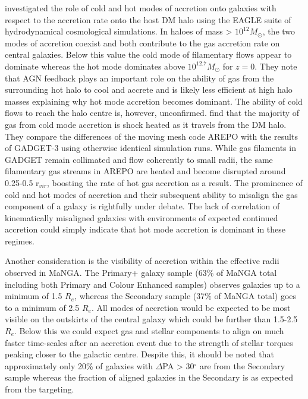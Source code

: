 \citet{correa2018} investigated the role of cold and hot modes of accretion onto galaxies with respect to the accretion rate onto the host DM halo using the EAGLE suite of hydrodynamical cosmological simulations. In haloes of mass > $10^{12}M_{\odot}$, the two modes of accretion coexist and both contribute to the gas accretion rate on central galaxies. Below this value the cold mode of filamentary flows appear to dominate whereas the hot mode dominates above $10^{12.7}M_{\odot}$ for $z = 0$.  They note that AGN feedback plays an important role on the ability of gas from the surrounding hot halo to cool and accrete and is likely less efficient at high halo masses explaining why hot mode accretion becomes dominant. The ability of cold flows to reach the halo centre is, however, unconfirmed. \citet{nelson2013} find that the majority of gas from cold mode accretion is shock heated as it travels from the DM halo. They compare the differences of the moving mesh code AREPO with the results of GADGET-3 using otherwise identical simulation runs. While gas filaments in GADGET remain collimated and flow coherently to small radii, the same filamentary gas streams in AREPO are heated and become disrupted around  0.25-0.5 r$_{vir}$, boosting the rate of hot gas accretion as a result. The prominence of cold and hot modes of accretion and their subsequent ability to misalign the gas component of a galaxy is rightfully under debate. The lack of correlation of kinematically misaligned galaxies with environments of expected continued accretion could simply indicate that hot mode accretion is dominant in these regimes. 

Another consideration is the visibility of accretion within the effective radii observed in MaNGA. The Primary+ galaxy sample (63\% of MaNGA total including both Primary and Colour Enhanced samples) observes galaxies up to a minimum of 1.5 $R_e$, whereas the Secondary sample (37\% of MaNGA total) goes to a minimum of 2.5 $R_e$. All modes of accretion would be expected to be most visible on the outskirts of the central galaxy which could be further than 1.5-2.5 $R_e$. Below this we could expect gas and stellar components to align on much faster time-scales after an accretion event due to the strength of stellar torques peaking closer to the galactic centre. Despite this, it should be noted that approximately only 20\% of galaxies with $\Delta$PA > 30$^{\circ}$ are from the Secondary sample whereas the fraction of aligned galaxies in the Secondary is as expected from the targeting. 

